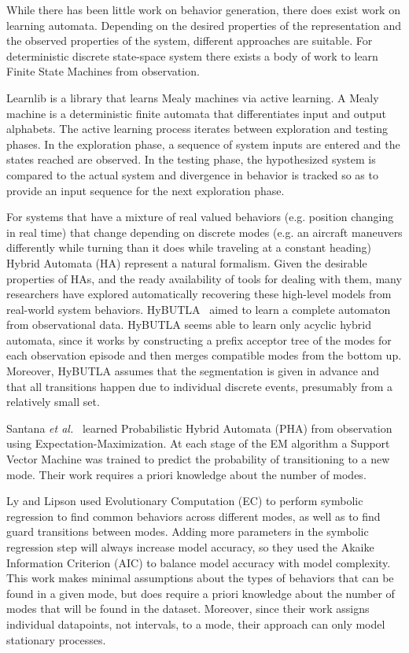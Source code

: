 \documentclass[12pt]{report}
\begin{document}
While there has been little work on behavior generation, there does exist work on learning automata. Depending on the desired properties of the representation and the observed properties of the system, different approaches are suitable.  For deterministic discrete state-space system there exists a body of work to learn Finite State Machines from observation.  

Learnlib \cite{steffen2011introduction} is a library that learns Mealy machines via active learning.  A Mealy machine is a deterministic finite automata that differentiates input and output alphabets. The active learning process iterates between exploration and testing phases.  In the exploration phase, a sequence of system inputs are entered and the states reached are observed.  In the testing phase, the hypothesized system is compared to the actual system and divergence in behavior is tracked so as to provide an input sequence for the next exploration phase.

For systems that have a mixture of real valued behaviors (e.g. position changing in real time) that change depending on discrete modes (e.g. an aircraft maneuvers differently while turning than it does while traveling at a constant heading) Hybrid Automata (HA) represent a natural formalism. 
Given the desirable properties of HAs, and the ready availability of tools for dealing with them, many researchers have explored automatically recovering these high-level models from real-world system behaviors.
HyBUTLA~\cite{niggemann2012learning} aimed to learn a complete automaton from observational data. HyBUTLA seems able to learn only acyclic hybrid automata, since it works by constructing a prefix acceptor tree of the modes for each observation episode and then merges compatible modes from the bottom up. Moreover, HyBUTLA assumes that the segmentation is given in advance and that all transitions happen due to individual discrete events, presumably from a relatively small set.


Santana \textit{et al.}~\cite{hybridmodels2015santana} learned Probabilistic Hybrid Automata (PHA) from observation using Expectation-Maximization.  At each stage of the EM algorithm a Support Vector Machine was trained to predict the probability of transitioning to a new mode. Their work requires a priori knowledge about the number of modes.


Ly and Lipson used Evolutionary Computation (EC) to perform symbolic regression \cite{ly2012learning} to find common behaviors across different modes, as well as to find guard transitions between modes.  Adding more parameters in the symbolic regression step will always increase model accuracy, so they used the Akaike Information Criterion (AIC) to balance model accuracy with model complexity.  This work makes minimal assumptions about the types of behaviors that can be found in a given mode, but does require a priori knowledge about the number of modes that will be found in the dataset. Moreover, since their work assigns individual datapoints, not intervals, to a mode, their approach can only model stationary processes.
\end{document}
